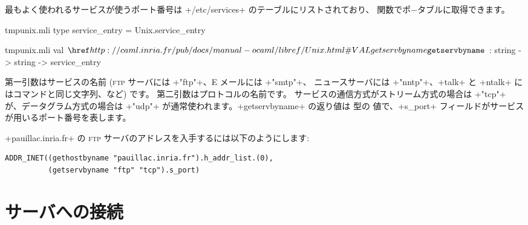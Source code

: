 最もよく使われるサービスが使うポート番号は \ml+/etc/services+ のテーブルにリストされており、
 関数でポ−タブルに取得できます。
%
\begin{codefile}{tmpunix.mli}
type service_entry = Unix.service_entry
\end{codefile}
%
\begin{listingcodefile}{tmpunix.mli}
val $\libvalue{Unix}{getservbyname}$ : string -> string -> service_entry
\end{listingcodefile}
%
第一引数はサービスの名前 (\textsc{ftp} サーバには \ml+"ftp"+、E メールには \ml+"smtp"+、
ニュースサーバには \ml+"nntp"+、\ml+talk+ と \ml+ntalk+ にはコマンドと同じ文字列、など) です。
第二引数はプロトコルの名前です。
サービスの通信方式がストリーム方式の場合は \ml+"tcp"+ が、データグラム方式の場合は
\ml+"udp"+ が通常使われます。\ml+getservbyname+ の返り値は  型の
値で、\ml+s_port+ フィールドがサービスが用いるポート番号を表します。


\begin{example} %
\ml+pauillac.inria.fr+ の \textsc{ftp} サーバのアドレスを入手するには以下のようにします:
%
\begin{lstlisting}
ADDR_INET((gethostbyname "pauillac.inria.fr").h_addr_list.(0),
          (getservbyname "ftp" "tcp").s_port)
\end{lstlisting}
\end{example}


\section{サーバへの接続}

